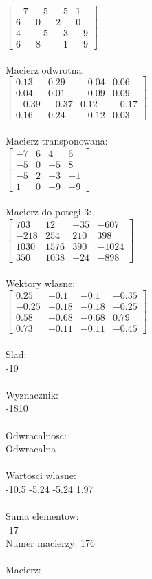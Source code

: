\documentclass[a4paper,12pt]{article}
\begin{document}
$\begin{bmatrix} -7&-5&-5&1\\6&0&2&0\\4&-5&-3&-9\\6&8&-1&-9 \end{bmatrix}$
\\
\\
Macierz odwrotna:\\

$\begin{bmatrix} 0.13&0.29&-0.04&0.06\\0.04&0.01&-0.09&0.09\\-0.39&-0.37&0.12&-0.17\\0.16&0.24&-0.12&0.03 \end{bmatrix}$
\\
\\
Macierz transponowana:\\

$\begin{bmatrix} -7&6&4&6\\-5&0&-5&8\\-5&2&-3&-1\\1&0&-9&-9 \end{bmatrix}$
\\
\\
Macierz do potegi 3:\\

$\begin{bmatrix} 703&12&-35&-607\\-218&254&210&398\\1030&1576&390&-1024\\350&1038&-24&-898 \end{bmatrix}$
\\
\\
Wektory wlasne:\\

$\begin{bmatrix} 0.25&-0.1&-0.1&-0.35\\-0.25&-0.18&-0.18&-0.25\\0.58&-0.68&-0.68&0.79\\0.73&-0.11&-0.11&-0.45 \end{bmatrix}$
\\
\\
Slad:\\
-19
\\
\\
Wyznacznik:\\
-1810
\\
\\
Odwracalnosc:\\
Odwracalna
\\
\\
Wartosci wlasne:\\
-10.5 -5.24 -5.24 1.97
\\
\\
Suma elementow:\\
-17
\\
\newpage
Numer macierzy:
176
\\
\\
Macierz:\\
\end{document}
